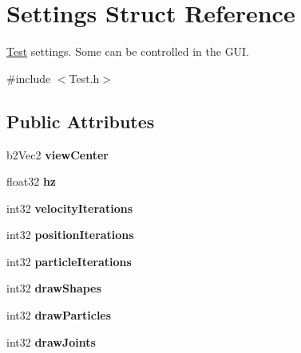 \hypertarget{structSettings}{\section{Settings Struct Reference}
\label{structSettings}
}


\hyperlink{classTest}{Test} settings. Some can be controlled in the G\-U\-I.  




{\ttfamily \#include $<$Test.\-h$>$}

\subsection*{Public Attributes}
\begin{DoxyCompactItemize}
\item 
\hypertarget{structSettings_a9f73ff7bfe24c0ec00f00637ad660afa}{b2\-Vec2 {\bfseries view\-Center}}\label{structSettings_a9f73ff7bfe24c0ec00f00637ad660afa}

\item 
\hypertarget{structSettings_a81f52938e3bfe4976755e77e940ca0e0}{float32 {\bfseries hz}}\label{structSettings_a81f52938e3bfe4976755e77e940ca0e0}

\item 
\hypertarget{structSettings_aef56168e9043d5a6f264a57fc0d0823a}{int32 {\bfseries velocity\-Iterations}}\label{structSettings_aef56168e9043d5a6f264a57fc0d0823a}

\item 
\hypertarget{structSettings_ae66b1defd12295dd5dce2362fcdad12f}{int32 {\bfseries position\-Iterations}}\label{structSettings_ae66b1defd12295dd5dce2362fcdad12f}

\item 
\hypertarget{structSettings_ab0b9829f65998b56807ab6d30d013e56}{int32 {\bfseries particle\-Iterations}}\label{structSettings_ab0b9829f65998b56807ab6d30d013e56}

\item 
\hypertarget{structSettings_a4a8172dd21368b12a8442723f30914bf}{int32 {\bfseries draw\-Shapes}}\label{structSettings_a4a8172dd21368b12a8442723f30914bf}

\item 
\hypertarget{structSettings_a91ba62f62bb55f5332765b10e0dd9033}{int32 {\bfseries draw\-Particles}}\label{structSettings_a91ba62f62bb55f5332765b10e0dd9033}

\item 
\hypertarget{structSettings_ab03e798642ff7d039d5efa3e0d5e86cb}{int32 {\bfseries draw\-Joints}}\label{structSettings_ab03e798642ff7d039d5efa3e0d5e86cb}


\end{DoxyCompactItemize}
